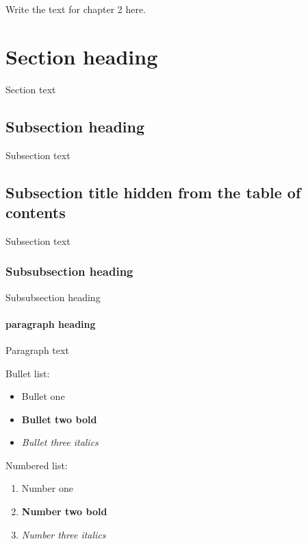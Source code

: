

Write the text for chapter 2 here.

\section{Section heading}

Section text

\subsection{Subsection heading}

Subsection text

\subsection*{Subsection title hidden from the table of contents}

Subsection text

\subsubsection{Subsubsection heading}

Subsubsection heading

\paragraph{paragraph heading}
Paragraph text


\newpage

Bullet list:
\begin{itemize}
    \item Bullet one
    \item \textbf{Bullet two bold}
    \item \textit{Bullet three italics}
\end{itemize}

Numbered list:
\begin{enumerate}
    \item Number one
    \item \textbf{Number two bold}
    \item \textit{Number three italics} 
\end{enumerate}
    
